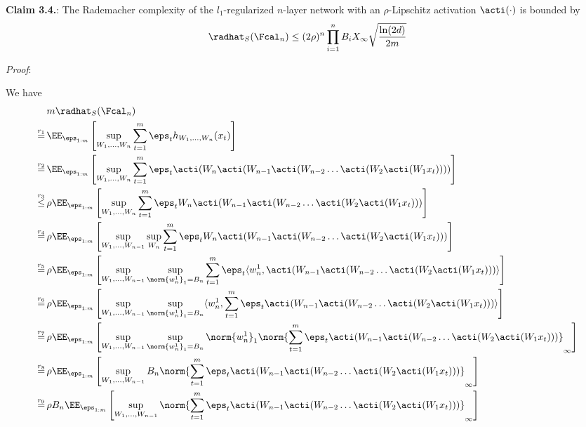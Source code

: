\textbf{Claim 3.4.}: The Rademacher complexity of the $l_1$-regularized $n$-layer network with an $\rho$-Lipschitz activation $\acti(\cdot)$ is bounded by
\begin{align*}
  \radhat_S(\Fcal_n) \le (2\rho)^{n} \prod_{i=1}^{n}B_{i} X_{\infty}\sqrt{\frac{\ln(2d)}{2m}} 
\end{align*}

\textit{Proof}: 

\allowdisplaybreaks
We have
\begin{align*}
  &m\radhat_S(\Fcal_n) \\
  \stackrel{r_1}{=}\,&\EE_{\eps_{1:m}} \left[ \sup_{\substack{ W_1,\ldots,W_n}} \sum_{t=1}^m \eps_{t}h_{W_1,\ldots,W_n}(x_t) \right] \\
  \stackrel{r_2}{=}\,&\EE_{\eps_{1:m}} \left[ \sup_{\substack{ W_1,\ldots,W_n}} \sum_{t=1}^m \eps_{t}\acti(W_n\acti(W_{n-1}\acti(W_{n-2}\ldots \acti(W_2\acti(W_1x_t)))) \right] \\
  \stackrel{r_3}{\le}\,&\rho \EE_{\eps_{1:m}} \left[ \sup_{\substack{ W_1,\ldots,W_n}} \sum_{t=1}^m \eps_{t}W_n\acti(W_{n-1}\acti(W_{n-2}\ldots \acti(W_2\acti(W_1x_t))) \right] \\
  \stackrel{r_4}{=}\,&\rho \EE_{\eps_{1:m}} \left[ \sup_{\substack{ W_1,\ldots,W_{n-1}}} \sup_{W_n} \sum_{t=1}^m \eps_{t}W_n\acti(W_{n-1}\acti(W_{n-2}\ldots \acti(W_2\acti(W_1x_t))) \right] \\
  \stackrel{r_5}{=}\,&\rho \EE_{\eps_{1:m}} \left[ \sup_{\substack{ W_1,\ldots,W_{n-1}}} \sup_{\norm{w_n^1}_1 = B_n} \sum_{t=1}^m \eps_{t} \langle w_n^1, \acti(W_{n-1}\acti(W_{n-2}\ldots \acti(W_2\acti(W_1x_t))) \rangle \right] \\
  \stackrel{r_6}{=}\,&\rho \EE_{\eps_{1:m}} \left[ \sup_{\substack{ W_1,\ldots,W_{n-1}}} \sup_{\norm{w_n^1}_1 = B_n} \langle w_n^1, \sum_{t=1}^m \eps_{t} \acti(W_{n-1}\acti(W_{n-2}\ldots \acti(W_2\acti(W_1x_t))) \rangle \right] \\
  \stackrel{r_7}{=}\,&\rho \EE_{\eps_{1:m}} \left[ \sup_{\substack{ W_1,\ldots,W_{n-1}}} \sup_{\norm{w_n^1}_1 = B_n}  \norm{w_n^1}_1 \norm{\sum_{t=1}^m \eps_{t} \acti(W_{n-1}\acti(W_{n-2}\ldots \acti(W_2\acti(W_1x_t)))}_{\infty} \right] \\
  \stackrel{r_8}{=}\,&\rho \EE_{\eps_{1:m}} \left[ \sup_{\substack{ W_1,\ldots,W_{n-1}}} B_n \norm{\sum_{t=1}^m \eps_{t} \acti(W_{n-1}\acti(W_{n-2}\ldots \acti(W_2\acti(W_1x_t)))}_{\infty} \right] \\
  \stackrel{r_9}{=}\,&\rho B_n \EE_{\eps_{1:m}} \left[ \sup_{\substack{ W_1,\ldots,W_{n-1}}} \norm{\sum_{t=1}^m \eps_{t} \acti(W_{n-1}\acti(W_{n-2}\ldots \acti(W_2\acti(W_1x_t)))}_{\infty} \right] \\

\end{align*}
